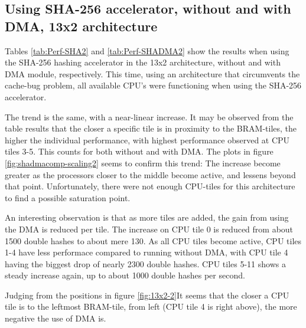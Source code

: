 \begin{appendix}
\subsection{Using SHA-256 accelerator, without and with DMA, 13x2 architecture}

Tables \ref{tab:Perf-SHA2} and \ref{tab:Perf-SHADMA2} show the results when using the SHA-256 hashing accelerator in the 13x2 architecture, without and with DMA module, respectively.
This time, using an architecture that circumvents the cache-bug problem, all available CPU's were functioning when using the SHA-256 accelerator.

The trend is the same, with a near-linear increase.
It may be observed from the table results that the closer a specific tile is in proximity to the BRAM-tiles, the higher the individual performance, with highest performance observed at CPU tiles 3-5.
This counts for both without and with DMA. 
The plots in figure \ref{fig:shadmacomp-scaling2} seems to confirm this trend: The increase become greater as the processors closer to the middle become active, and lessens beyond that point.
Unfortunately, there were not enough CPU-tiles for this architecture to find a possible saturation point.

An interesting observation is that as more tiles are added, the gain from using the DMA is reduced per tile.
The increase on CPU tile 0 is reduced from about 1500 double hashes to about mere 130.
As all CPU tiles become active, CPU tiles 1-4 have less performace compared to running without DMA, with CPU tile 4 having the biggest drop of nearly 2300 double hashes. 
CPU tiles 5-11 shows a steady increase again, up to about 1000 double hashes per second.

Judging from the positions in figure \ref{fig:13x2-2}It seems that the closer a CPU tile is to the leftmost BRAM-tile, from left (CPU tile 4 is right above), the more negative the use of DMA is.



\end{appendix}
